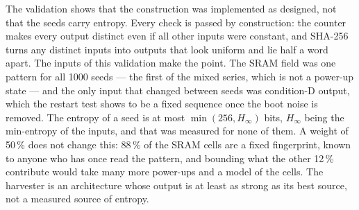 The validation shows that the construction was implemented as designed,
not that the seeds carry entropy. Every check is passed by construction:
the counter makes every output distinct even if all other inputs were
constant, and SHA-256 turns any distinct inputs into outputs that look
uniform and lie half a word apart. The inputs of this validation make the
point. The SRAM field was one pattern for all 1000 seeds --- the first of
the mixed series, which is not a power-up state --- and the only input
that changed between seeds was condition-D output, which the restart test
shows to be a fixed sequence once the boot noise is removed. The entropy
of a seed is at most $\min(256, H_\infty)$ bits, $H_\infty$ being the
min-entropy of the inputs, and that was measured for none of them. A
weight of 50\,\% does not change this: 88\,\% of the SRAM cells are a
fixed fingerprint, known to anyone who has once read the pattern, and
bounding what the other 12\,\% contribute would take many more power-ups
and a model of the cells. The harvester is an architecture whose output is
at least as strong as its best source, not a measured source of entropy.

